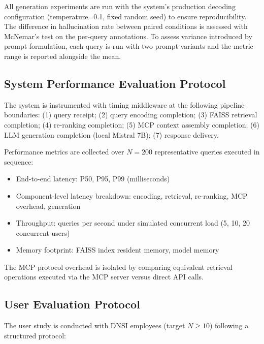 All generation experiments are run with the system's production decoding configuration (temperature=0.1, fixed random seed) to ensure reproducibility. The difference in hallucination rate between paired conditions is assessed with McNemar's test \citep{McNemar1947} on the per-query annotations. To assess variance introduced by prompt formulation, each query is run with two prompt variants and the metric range is reported alongside the mean.

\subsection{System Performance Evaluation Protocol}

The system is instrumented with timing middleware at the following pipeline boundaries: (1) query receipt; (2) query encoding completion; (3) FAISS retrieval completion; (4) re-ranking completion; (5) MCP context assembly completion; (6) LLM generation completion (local Mistral 7B); (7) response delivery.

Performance metrics are collected over $N=200$ representative queries executed in sequence:

\begin{itemize}
  \item End-to-end latency: P50, P95, P99 (milliseconds)
  \item Component-level latency breakdown: encoding, retrieval, re-ranking, MCP overhead, generation
  \item Throughput: queries per second under simulated concurrent load (5, 10, 20 concurrent users)
  \item Memory footprint: FAISS index resident memory, model memory
\end{itemize}

The MCP protocol overhead is isolated by comparing equivalent retrieval operations executed via the MCP server versus direct API calls.

\subsection{User Evaluation Protocol}

The user study is conducted with DNSI employees (target $N \geq 10$) following a structured protocol:

